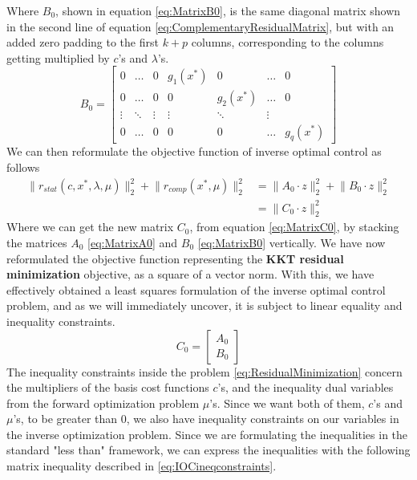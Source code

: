 \documentclass[12pt, a4paper]{article}
\newcommand{\norm}[1]{\lVert#1\rVert_2}         %
\begin{document}
Where \( B_0\), shown in equation \eqref{eq:MatrixB0}, is the same diagonal matrix shown in the second line of equation \eqref{eq:ComplementaryResidualMatrix}, but with an added zero padding to the first \( k+p \) columns, corresponding to the columns getting multiplied by \( c\)'s and \(\lambda\)'s.
\begin{equation} \label{eq:MatrixB0}
    B_0 =
    \begin{bmatrix}
    0 & \ldots & 0 & g_1(x^*) & 0 & \ldots & 0 \\
    0 & \ldots & 0 & 0 & g_2(x^*) & \dots & 0 \\
    \vdots & \ddots & \vdots & \vdots & \ddots & \vdots \\
    0 & \ldots & 0 & 0 & 0 & \ldots & g_q(x^*)
    \end{bmatrix}
\end{equation}
We can then reformulate the objective function of inverse optimal control as follows
\begin{equation} \label{eq:ResidualMatrixForm}
\begin{split}
    \norm{r_{stat}(c, x^*, \lambda, \mu)}^2 + \norm{{r_{comp}}(x^*, \mu)}^2 &= \norm{A_0 \cdot z}^2 + \norm{B_0 \cdot z}^2 \\
    &= \norm{C_0 \cdot z}^2
\end{split}
\end{equation}
Where we can get the new matrix \( C_0 \), from equation \eqref{eq:MatrixC0}, by stacking the matrices \( A_0\) \eqref{eq:MatrixA0} and \( B_0\) \eqref{eq:MatrixB0} vertically. We have now reformulated the objective function representing the \textbf{KKT residual minimization} objective, as a square of a vector norm. With this, we have effectively obtained a least squares formulation of the inverse optimal control problem, and as we will immediately uncover, it is subject to linear equality and inequality constraints.
\begin{equation}\label{eq:MatrixC0}
C_0 = 
    \begin{bmatrix}
    A_0 \\
    B_0
    \end{bmatrix}
\end{equation}
The inequality constraints inside the problem \eqref{eq:ResidualMinimization} concern the multipliers of the basis cost functions $c$'s, and the inequality dual variables from the forward optimization problem $\mu$'s. Since we want both of them, \(c\)'s and \(\mu\)'s, to be greater than 0, we also have inequality constraints on our variables in the inverse optimization problem. Since we are formulating the inequalities in the standard "less than" framework, we can express the inequalities with the following matrix inequality described in \eqref{eq:IOCineqconstraints}.
\end{document}
